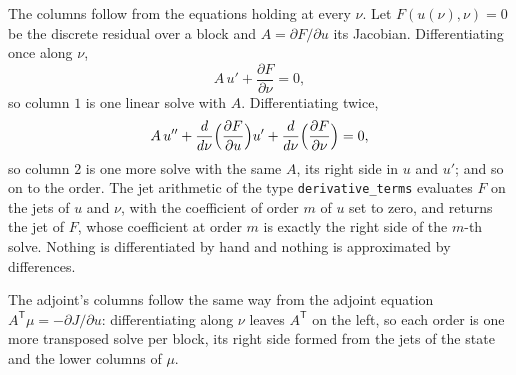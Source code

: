 \documentclass[10pt]{article}
\begin{document}
The columns follow from the equations holding at every $\nu$. Let
$F(u(\nu), \nu) = 0$ be the discrete residual over a block and
$A = \partial F / \partial u$ its Jacobian. Differentiating once along
$\nu$,
\[
  A\, u' + \frac{\partial F}{\partial \nu} = 0,
\]
so column $1$ is one linear solve with $A$. Differentiating twice,
\[
  A\, u'' + \frac{d}{d\nu}\Bigl(\frac{\partial F}{\partial u}\Bigr) u'
          + \frac{d}{d\nu}\Bigl(\frac{\partial F}{\partial \nu}\Bigr) = 0,
\]
so column $2$ is one more solve with the same $A$, its right side in
$u$ and $u'$; and so on to the order. The jet arithmetic of the type
\texttt{derivative\_terms} evaluates $F$ on the jets of $u$ and $\nu$,
with the coefficient of order $m$ of $u$ set to zero, and returns the
jet of $F$, whose coefficient at order $m$ is exactly the right side of
the $m$-th solve. Nothing is differentiated by hand and nothing is
approximated by differences.

The adjoint's columns follow the same way from the adjoint equation
$A^{\mathsf T} \mu = -\partial J / \partial u$: differentiating along
$\nu$ leaves $A^{\mathsf T}$ on the left, so each order is one more
transposed solve per block, its right side formed from the jets of the
state and the lower columns of $\mu$.
\end{document}
